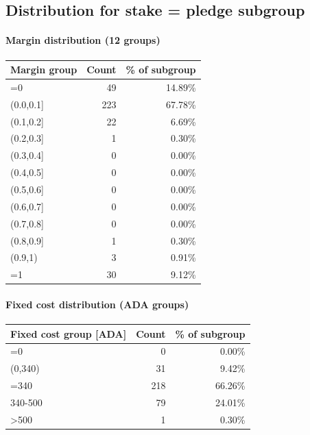 \subsection*{Distribution for stake = pledge subgroup}
\paragraph{Margin distribution (12 groups)}
\begin{table}[h]
\centering
\begin{tabular}{lrr}
\toprule
Margin group & Count & \% of subgroup \\
\midrule
{}=0 & 49 & 14.89\% \\
{}(0.0,0.1] & 223 & 67.78\% \\
{}(0.1,0.2] & 22 & 6.69\% \\
{}(0.2,0.3] & 1 & 0.30\% \\
{}(0.3,0.4] & 0 & 0.00\% \\
{}(0.4,0.5] & 0 & 0.00\% \\
{}(0.5,0.6] & 0 & 0.00\% \\
{}(0.6,0.7] & 0 & 0.00\% \\
{}(0.7,0.8] & 0 & 0.00\% \\
{}(0.8,0.9] & 1 & 0.30\% \\
{}(0.9,1) & 3 & 0.91\% \\
{}=1 & 30 & 9.12\% \\
\bottomrule
\end{tabular}
\end{table}
\paragraph{Fixed cost distribution (ADA groups)}
\begin{table}[h]
\centering
\begin{tabular}{lrr}
\toprule
Fixed cost group [ADA] & Count & \% of subgroup \\
\midrule
{}=0 & 0 & 0.00\% \\
{}(0,340) & 31 & 9.42\% \\
{}=340 & 218 & 66.26\% \\
{}340-500 & 79 & 24.01\% \\
{}>500 & 1 & 0.30\% \\
\bottomrule
\end{tabular}
\end{table}

